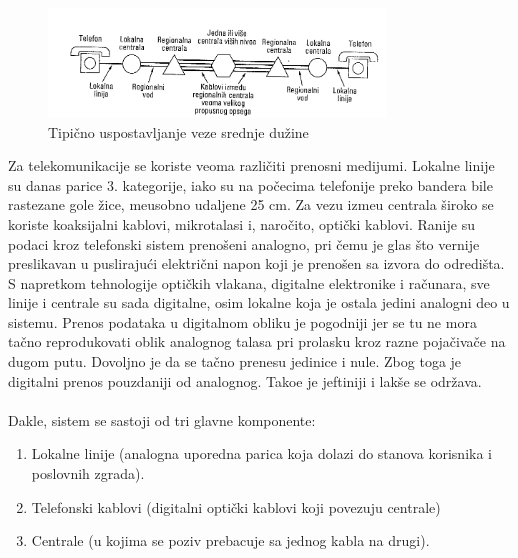 \documentclass{article} %
\begin{document}
\begin{figure}[H]
	\centering
	\includegraphics[width=0.8\textwidth]{slike-aplikativniSloj/fiksna.png}
	\caption{Tipi\v cno uspostavljanje veze srednje du\v zine}
	\label{fiksna telefonija}
\end{figure}

Za telekomunikacije se koriste veoma razli\v citi prenosni medijumi. Lokalne linije su danas parice 3. kategorije, iako su na po\v cecima telefonije preko bandera bile rastezane gole \v zice, me\dj usobno udaljene 25 cm. Za vezu izme\dj u centrala \v siroko se koriste koaksijalni kablovi, mikrotalasi i, naro\v cito, opti\v cki kablovi. Ranije su podaci kroz telefonski sistem preno\v seni analogno, pri \v cemu je glas \v sto vernije preslikavan u pusliraju\' ci elektri\v cni napon koji je preno\v sen sa izvora do odredi\v sta. S napretkom tehnologije opti\v ckih vlakana, digitalne elektronike i ra\v cunara, sve linije i centrale su sada digitalne, osim lokalne koja je ostala jedini analogni deo u sistemu.  Prenos podataka u digitalnom obliku je pogodniji jer se tu ne mora ta\v cno reprodukovati oblik analognog talasa pri prolasku kroz razne poja\v civa\v ce na dugom putu. Dovoljno je da se ta\v cno prenesu jedinice i nule. Zbog toga je digitalni prenos pouzdaniji od analognog. Tako\dj e je jeftiniji i lak\v se se odr\v zava. 
\\
\\ Dakle, sistem se sastoji od tri glavne komponente:
\begin{enumerate}
	\item Lokalne linije (analogna uporedna parica koja dolazi do stanova korisnika i poslovnih zgrada).
	\item Telefonski kablovi (digitalni opti\v cki kablovi koji povezuju centrale)
	\item Centrale (u kojima se poziv prebacuje sa jednog kabla na drugi).
\end{enumerate}
\end{document}
